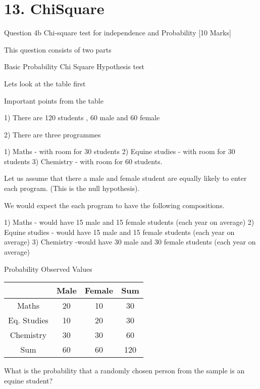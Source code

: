 \documentclass[]{report}
\begin{document}
			
			\chapter{13. ChiSquare}
			
			
			Question 4b  
			Chi-square test for independence and Probability [10 Marks]
			
			This question consists of two parts
			
			Basic Probability
			Chi Square Hypothesis test
			
			Lets look at the table first
			
			Important points from the table
			
			1) There are 120 students , 60 male and 60 female
			
			2) There are three programmes
			
			1) Maths - with room for 30 students
			2) Equine studies - with room for 30 students
			3) Chemistry - with room for 60 students.
			
			Let us assume that there a male and female student are equally likely to enter each program. (This is the null hypothesis).
			
			We would expect the each program to have the following compositions.
			
			1) Maths - would have 15 male and 15 female students (each year on average)
			2) Equine studies - would have 15 male and 15 female students (each year on average)
			3) Chemistry -would have 30 male and 30 female students (each year on average)
			
			
			Probability
			Observed Values


\begin{center}
	\begin{tabular}{cccc}
	&	Male	&	Female	&	Sum	\\ \hline
	Maths	&	20	&	10	&	30	\\ \hline
	Eq. Studies	&	10	&	20	&	30	\\ \hline
	Chemistry	&	30	&	30	&	60	\\ \hline
	Sum	&	60	&	60	&	120	\\ \hline

	\end{tabular}
\end{center}
			
			

			
			What is the probability that a randomly chosen person from the sample is an equine student?
			
\end{document}
